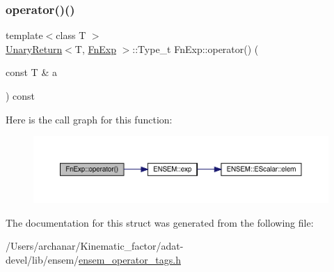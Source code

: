 \subsubsection{\texorpdfstring{operator()()}{operator()()}\hspace{0.1cm}{\footnotesize\ttfamily [3/3]}}
{\footnotesize\ttfamily template$<$class T $>$ \\
\mbox{\hyperlink{structUnaryReturn}{Unary\+Return}}$<$T, \mbox{\hyperlink{structFnExp}{Fn\+Exp}} $>$\+::Type\+\_\+t Fn\+Exp\+::operator() (\begin{DoxyParamCaption}\item[{const T \&}]{a }\end{DoxyParamCaption}) const\hspace{0.3cm}{\ttfamily [inline]}}

Here is the call graph for this function\+:
\nopagebreak
\begin{figure}[H]
\begin{center}
\leavevmode
\includegraphics[width=350pt]{d3/d99/structFnExp_a42b9ce4950a3772fe907b8da3497267e_cgraph}
\end{center}
\end{figure}


The documentation for this struct was generated from the following file\+:\begin{DoxyCompactItemize}
\item 
/\+Users/archanar/\+Kinematic\+\_\+factor/adat-\/devel/lib/ensem/\mbox{\hyperlink{adat-devel_2lib_2ensem_2ensem__operator__tags_8h}{ensem\+\_\+operator\+\_\+tags.\+h}}\end{DoxyCompactItemize}
